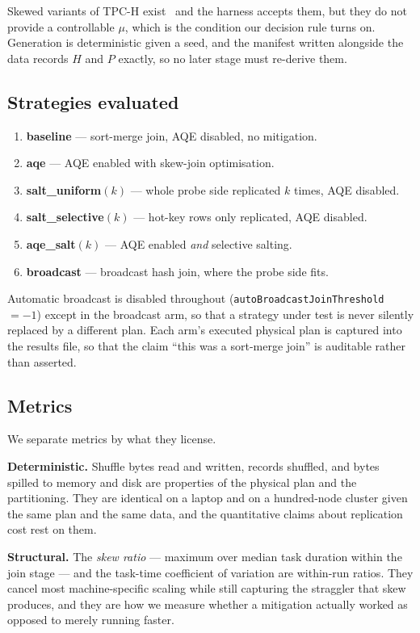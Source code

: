 Skewed variants of TPC-H exist~\cite{microsoft_skewgen, tpch} and the harness
accepts them, but they do not provide a controllable $\mu$, which is the
condition our decision rule turns on. Generation is deterministic given a seed,
and the manifest written alongside the data records $H$ and $P$ exactly, so no
later stage must re-derive them.

\subsection{Strategies evaluated}

\begin{enumerate}
\item \textbf{baseline} --- sort-merge join, AQE disabled, no mitigation.
\item \textbf{aqe} --- AQE enabled with skew-join optimisation.
\item \textbf{salt\_uniform}$(k)$ --- whole probe side replicated $k$ times,
AQE disabled.
\item \textbf{salt\_selective}$(k)$ --- hot-key rows only replicated, AQE
disabled.
\item \textbf{aqe\_salt}$(k)$ --- AQE enabled \emph{and} selective salting.
\item \textbf{broadcast} --- broadcast hash join, where the probe side fits.
\end{enumerate}

Automatic broadcast is disabled throughout
(\texttt{autoBroadcastJoinThreshold} $=-1$) except in the broadcast arm, so
that a strategy under test is never silently replaced by a different plan. Each
arm's executed physical plan is captured into the results file, so that the
claim ``this was a sort-merge join'' is auditable rather than asserted.

\subsection{Metrics}

We separate metrics by what they license.

\textbf{Deterministic.} Shuffle bytes read and written, records shuffled, and
bytes spilled to memory and disk are properties of the physical plan and the
partitioning. They are identical on a laptop and on a hundred-node cluster
given the same plan and the same data, and the quantitative claims about
replication cost rest on them.

\textbf{Structural.} The \emph{skew ratio} --- maximum over median task
duration within the join stage --- and the task-time coefficient of variation
are within-run ratios. They cancel most machine-specific scaling while still
capturing the straggler that skew produces, and they are how we measure whether
a mitigation actually worked as opposed to merely running faster.

